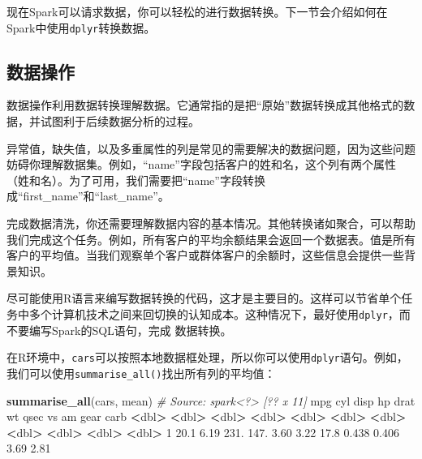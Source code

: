 \documentclass[
]{article}
\newenvironment{Shaded}{\begin{snugshade}}{\end{snugshade}}
\newcommand{\CommentTok}[1]{\textcolor[rgb]{0.56,0.35,0.01}{\textit{#1}}}
\newcommand{\DecValTok}[1]{\textcolor[rgb]{0.00,0.00,0.81}{#1}}
\newcommand{\ErrorTok}[1]{\textcolor[rgb]{0.64,0.00,0.00}{\textbf{#1}}}
\newcommand{\FloatTok}[1]{\textcolor[rgb]{0.00,0.00,0.81}{#1}}
\newcommand{\KeywordTok}[1]{\textcolor[rgb]{0.13,0.29,0.53}{\textbf{#1}}}
\newcommand{\NormalTok}[1]{#1}
\newcommand{\OperatorTok}[1]{\textcolor[rgb]{0.81,0.36,0.00}{\textbf{#1}}}
\newcommand{\StringTok}[1]{\textcolor[rgb]{0.31,0.60,0.02}{#1}}
\begin{document}
现在Spark可以请求数据，你可以轻松的进行数据转换。下一节会介绍如何在Spark中使用\texttt{dplyr}转换数据。

\hypertarget{ux6570ux636eux64cdux4f5c}{%
\subsection{数据操作}\label{ux6570ux636eux64cdux4f5c}}

数据操作利用数据转换理解数据。它通常指的是把``原始''数据转换成其他格式的数据，并试图利于后续数据分析的过程。

异常值，缺失值，以及多重属性的列是常见的需要解决的数据问题，因为这些问题妨碍你理解数据集。例如，``name''字段包括客户的姓和名，这个列有两个属性（姓和名）。为了可用，我们需要把``name''字段转换成``first\_name''和``last\_name''。

完成数据清洗，你还需要理解数据内容的基本情况。其他转换诸如聚合，可以帮助我们完成这个任务。例如，所有客户的平均余额结果会返回一个数据表。值是所有客户的平均值。当我们观察单个客户或群体客户的余额时，这些信息会提供一些背景知识。

尽可能使用R语言来编写数据转换的代码，这才是主要目的。这样可以节省单个任务中多个计算机技术之间来回切换的认知成本。这种情况下，最好使用\texttt{dplyr}，而不要编写Spark的SQL语句，完成
数据转换。

在R环境中，\texttt{cars}可以按照本地数据框处理，所以你可以使用\texttt{dplyr}语句。例如，我们可以使用\texttt{summarise\_all()}找出所有列的平均值：

\begin{Shaded}
\begin{Highlighting}[]
\KeywordTok{summarise_all}\NormalTok{(cars, mean)}
\CommentTok{# Source: spark<?> [?? x 11]}
\NormalTok{ mpg cyl disp hp drat wt qsec vs am gear carb}
 \OperatorTok{<}\NormalTok{dbl}\OperatorTok{>}\StringTok{ }\ErrorTok{<}\NormalTok{dbl}\OperatorTok{>}\StringTok{ }\ErrorTok{<}\NormalTok{dbl}\OperatorTok{>}\StringTok{ }\ErrorTok{<}\NormalTok{dbl}\OperatorTok{>}\StringTok{ }\ErrorTok{<}\NormalTok{dbl}\OperatorTok{>}\StringTok{ }\ErrorTok{<}\NormalTok{dbl}\OperatorTok{>}\StringTok{ }\ErrorTok{<}\NormalTok{dbl}\OperatorTok{>}\StringTok{ }\ErrorTok{<}\NormalTok{dbl}\OperatorTok{>}\StringTok{ }\ErrorTok{<}\NormalTok{dbl}\OperatorTok{>}\StringTok{ }\ErrorTok{<}\NormalTok{dbl}\OperatorTok{>}\StringTok{ }\ErrorTok{<}\NormalTok{dbl}\OperatorTok{>}
\DecValTok{1} \FloatTok{20.1} \FloatTok{6.19} \FloatTok{231.} \FloatTok{147.} \FloatTok{3.60} \FloatTok{3.22} \FloatTok{17.8} \FloatTok{0.438} \FloatTok{0.406} \FloatTok{3.69} \FloatTok{2.81}
\end{Highlighting}
\end{Shaded}
\end{document}
